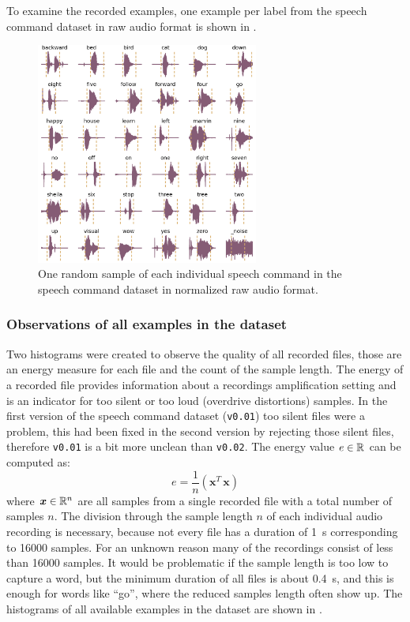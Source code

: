 To examine the recorded examples, one example per label from the speech command dataset in raw audio format is shown in .
\begin{figure}[!ht]
  \centering
    \includegraphics[width=0.65\textwidth]{./5_exp/figs/exp_dataset_speech_cmd_wav_grid}
  \caption{One random sample of each individual speech command in the speech command dataset in normalized raw audio format.}
  \label{fig:exp_dataset_speech_cmd_wav_grid}
\end{figure}
\FloatBarrier
\noindent



\subsubsection{Observations of all examples in the dataset}
Two histograms were created to observe the quality of all recorded files, those are an energy measure for each file and the count of the sample length.
The energy of a recorded file provides information about a recordings amplification setting and is an indicator for too silent or too loud (overdrive distortions) samples. 
In the first version of the speech command dataset (\texttt{v0.01}) too silent files were a problem, this had been fixed in the second version by rejecting those silent files, therefore \texttt{v0.01} is a bit more unclean than \texttt{v0.02}.
The energy value $e \in \mathbb{R}$ can be computed as:
\begin{equation}\label{eq:exp_dataset_energy}
  e = \frac{1}{n} \left( \bm{x}^T\, \bm{x} \right)
\end{equation}
where $\bm{x} \in \mathbb{R}^n$ are all samples from a single recorded file with a total number of samples $n$.
The division through the sample length $n$ of each individual audio recording is necessary, because not every file has a duration of \SI{1}{\second} corresponding to 16000 samples.
For an unknown reason many of the recordings consist of less than 16000 samples.
It would be problematic if the sample length is too low to capture a word, but the minimum duration of all files is about \SI{0.4}{\second}, and this is enough for words like \enquote{go}, where the reduced samples length often show up.
The histograms of all available examples in the dataset are shown in .

